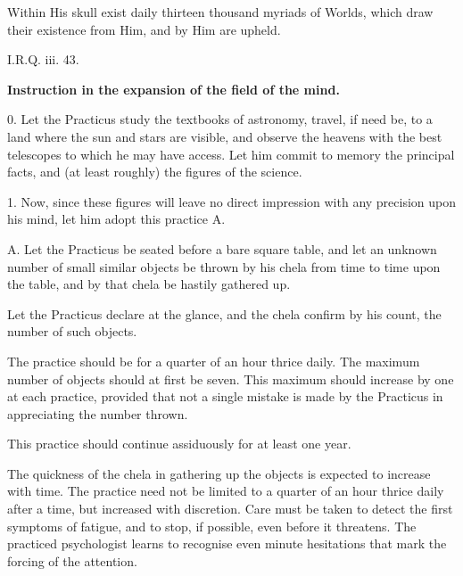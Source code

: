 
\epigraph{Within His skull exist daily thirteen thousand myriads of Worlds, which draw their existence from Him, and by Him are upheld.}{I.R.Q. iii. 43.}

\textbf{Instruction in the expansion of the field of the mind.}

0. Let the Practicus study the textbooks of astronomy, travel, if need be, to a land where the sun and stars are visible, and observe the heavens with the best telescopes to which he may have access. Let him commit to memory the principal facts, and (at least roughly) the figures of the science.

1. Now, since these figures will leave no direct impression with any precision upon his mind, let him adopt this practice A.


\begin{quoting}

A. Let the Practicus be seated before a bare square table, and let an unknown number of small similar objects be thrown by his chela from time to time upon the table, and by that chela be hastily gathered up.

Let the Practicus declare at the glance, and the chela confirm by his count, the number of such objects.

The practice should be for a quarter of an hour thrice daily. The maximum number of objects should at first be seven. This maximum should increase by one at each practice, provided that not a single mistake is made by the Practicus in appreciating the number thrown.

This practice should continue assiduously for at least one year.

The quickness of the chela in gathering up the objects is expected to increase with time. The practice need not be limited to a quarter of an hour thrice daily after a time, but increased with discretion. Care must be taken to detect the first symptoms of fatigue, and to stop, if possible, even before it threatens. The practiced psychologist learns to recognise even minute hesitations that mark the forcing of the attention.

\end{quoting}


